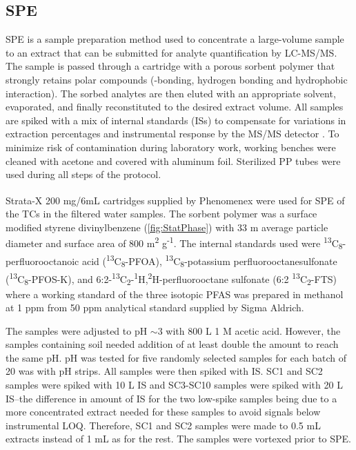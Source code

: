 \subsection{SPE}
SPE is a sample preparation method used to concentrate a large-volume sample to an extract that can be submitted for analyte quantification by LC-MS/MS. The sample is passed through a cartridge with a porous sorbent polymer that strongly retains polar compounds (\textpi-\textpi bonding, hydrogen bonding and hydrophobic interaction). The sorbed analytes are then eluted with an appropriate solvent, evaporated, and finally reconstituted to the desired extract volume. All samples are spiked with a mix of internal standards (ISs) to compensate for variations in extraction percentages and instrumental response by the MS/MS detector \citep{arvaniti2014}. To minimize risk of contamination during laboratory work, working benches were cleaned with acetone and covered with aluminum foil. Sterilized PP tubes were used during all steps of the protocol.

Strata-X\textsuperscript{\textregistered} 200 mg/6mL cartridges supplied by Phenomenex were used for SPE of the TCs in the filtered water samples. The sorbent polymer was a surface modified styrene divinylbenzene (\cref{fig:StatPhase}) with 33 \textmu m average particle diameter and surface area of 800 m\textsuperscript{2} g\textsuperscript{-1}. The internal standards used were \textsuperscript{13}C\textsubscript{8}-perfluorooctanoic acid  (\textsuperscript{13}C\textsubscript{8}-PFOA), \textsuperscript{13}C\textsubscript{8}-potassium perfluorooctanesulfonate (\textsuperscript{13}C\textsubscript{8}-PFOS-K), and 6:2-\textsuperscript{13}C\textsubscript{2}-\textsuperscript{1}H,\textsuperscript{2}H-perfluorooctane sulfonate  (6:2 \textsuperscript{13}C\textsubscript{2}-FTS) where a working standard of the three isotopic PFAS was prepared in methanol at 1 ppm from 50 ppm analytical standard supplied by Sigma Aldrich.

The samples were adjusted to pH $\sim$3 with 800 \textmu L 1 M acetic acid. However, the samples containing soil needed addition of at least double the amount to reach the same pH. pH was tested for five randomly selected samples for each batch of 20 was with pH strips. All samples were then spiked with IS. SC1 and SC2 samples were spiked with 10 \textmu L IS and SC3-SC10 samples were spiked with 20 \textmu L IS--the difference in amount of IS for the two low-spike samples being due to a more concentrated extract needed for these samples to avoid signals below instrumental LOQ. Therefore, SC1 and SC2 samples were made to 0.5 mL extracts instead of 1 mL as for the rest. The samples were vortexed prior to SPE.

